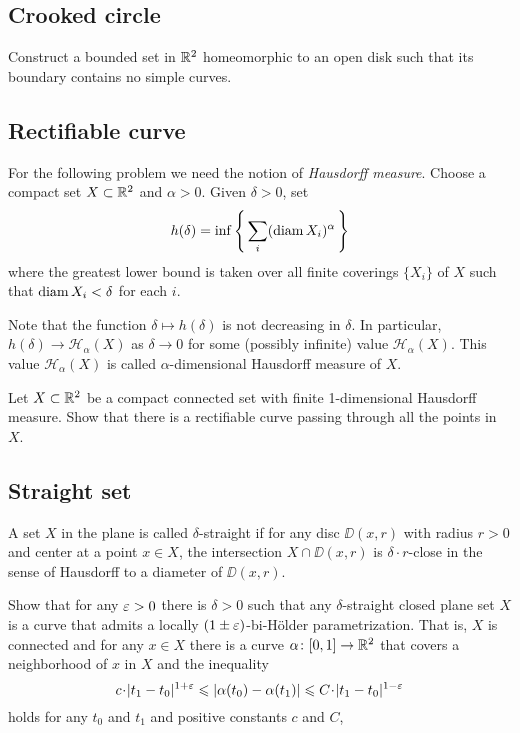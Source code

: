 \subsection*{Crooked circle}

\label{Crooked circle}

\begin{pr}
Construct 
a bounded set in $\mathbb{R}^2$
homeomorphic to an open disk
such that 
its boundary contains no simple curves.
\end{pr}

\subsection*{Rectifiable curve}
\label{Rectifiable curve}

For the following problem we need the notion of 
\emph{Hausdorff measure}.
Choose a compact set $X\subset\mathbb{R}^2$ and $\alpha>0$.
Given $\delta>0$, set
\[h(\delta)=\inf\left\{\,\sum_i(\operatorname{\rm diam}\nolimits X_i)^\alpha\,\right\}\]
where the greatest lower bound is taken over all finite coverings $\{X_i\}$ of $X$ 
such that $\operatorname{\rm diam}\nolimits X_i<\delta$ for each $i$.

Note that the function $\delta\mapsto h(\delta)$ is not decreasing in $\delta$.
In particular, $h(\delta)\to \mathcal{H}_\alpha(X)$ as $\delta\to 0$ for some (possibly infinite) value $\mathcal{H}_\alpha(X)$.
This value $\mathcal{H}_\alpha(X)$ is called $\alpha$-dimensional Hausdorff measure of $X$.

\begin{pr}
Let $X\subset \mathbb{R}^2$ be a compact connected set
with finite 1-dimensional Hausdorff measure. 
Show that there is a rectifiable curve passing through all the points in $X$.
\end{pr}

\subsection*{Straight set}

A set $X$ in the plane is called $\delta$-straight if for any disc $\DD(x,r)$ with radius $r>0$ and center at a point $x\in X$, the intersection 
$X\cap \DD(x,r)$ is $\delta\cdot r$-close in the sense of Hausdorff to a diameter of $\DD(x,r)$. 

\begin{pr}
Show that for any $\varepsilon>0$ there is $\delta>0$ such that any $\delta$-straight closed plane set $X$ is a curve that admits a locally $(1\pm\varepsilon)$-bi-H\"older parametrization.
That is, $X$ is connected and for any $x\in X$ there is a curve $\alpha\colon[0,1]\to \mathbb{R}^2$ that covers a neighborhood of $x$ in $X$ and the inequality
\[c\cdot |t_1-t_0|^{1+\eps}\le|\alpha(t_0)-\alpha(t_1)| \le C\cdot |t_1-t_0|^{1-\eps}\]
holds for any $t_0$ and $t_1$ and positive constants $c$ and $C$,
\end{pr}

